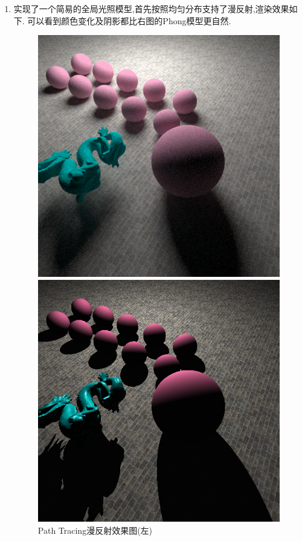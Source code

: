 \begin{enumerate}
  \item 实现了一个简易的全局光照模型,首先按照均匀分布支持了漫反射,渲染效果如下.
    可以看到颜色变化及阴影都比右图的Phong模型更自然.
    \begin{figure}[H]
      \begin{minipage}[b]{0.48\linewidth}
        \centering
        \includegraphics[width=\textwidth]{img/gllu_first.png}
      \end{minipage}
      \begin{minipage}[b]{0.48\linewidth}
        \centering
        \includegraphics[width=\textwidth]{img/compare_diffuse_phong.png}
      \end{minipage}
      \caption{Path Tracing漫反射效果图(左)\label{fig:pt_diffuse}}
    \end{figure}


\end{enumerate}
